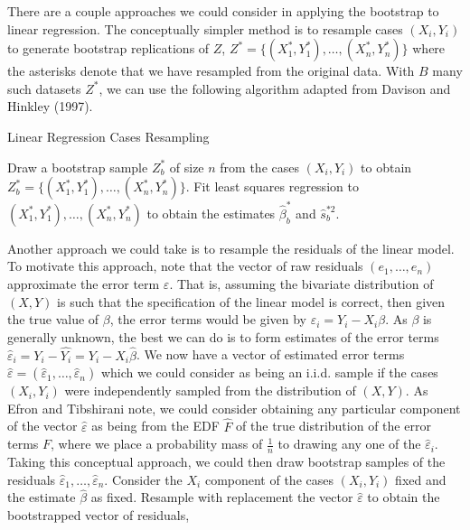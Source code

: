 \documentclass[12pt,twoside]{reedthesis}
\theoremstyle{definition}
\theoremstyle{definition}
\theoremstyle{definition}
\theoremstyle{remark}
\begin{document}
There are a couple approaches we could consider in applying the
bootstrap to linear regression. The conceptually simpler method is to
resample cases \((X_i,Y_i)\) to generate bootstrap replications of
\(Z\), \(Z^*=\{(X_1^*,Y_1^*),\ldots,(X_n^*,Y_n^*)\}\) where the
asterisks denote that we have resampled from the original data. With
\(B\) many such datasets \(Z^*\), we can use the following algorithm
adapted from Davison and Hinkley (1997).
\begin{algorithm}
        \caption{Linear Regression Cases Resampling}\label{cases resampling}
        \begin{algorithmic}[1]
            \State Draw a bootstrap sample $Z_b^*$ of size $n$ from the cases $(X_i,Y_i)$ to obtain $Z_b^*=\{(X_1^*,Y_1^*),\ldots,(X_n^*,Y_n^*)\}$.
            \State Fit least squares regression to $(X_1^*,Y_1^*),\ldots,(X_n^*,Y_n^*)$ to obtain the estimates $\hat{\beta}_b^*$ and $\hat{s}_b^{*2}$.
            \EndFor
        \end{algorithmic}
    \end{algorithm}
Another approach we could take is to resample the residuals of the
linear model. To motivate this approach, note that the vector of raw
residuals \((e_1,\ldots,e_n)\) approximate the error term
\(\varepsilon\). That is, assuming the bivariate distribution of
\((X,Y)\) is such that the specification of the linear model is correct,
then given the true value of \(\beta\), the error terms would be given
by \(\varepsilon_i=Y_i-X_i\beta\). As \(\beta\) is generally unknown,
the best we can do is to form estimates of the error terms
\(\hat{\varepsilon}_i=Y_i-\hat{Y_i}=Y_i-X_i\hat{\beta}\). We now have a
vector of estimated error terms
\(\hat{\varepsilon}=(\hat{\varepsilon}_1,\ldots,\hat{\varepsilon}_n)\)
which we could consider as being an i.i.d. sample if the cases
\((X_i,Y_i)\) were independently sampled from the distribution of
\((X,Y)\). As Efron and Tibshirani note, we could consider obtaining any
particular component of the vector \(\hat{\varepsilon}\) as being from
the EDF \(\hat{F}\) of the true distribution of the error terms \(F\),
where we place a probability mass of \(\frac{1}{n}\) to drawing any one
of the \(\hat{\varepsilon}_i\). Taking this conceptual approach, we
could then draw bootstrap samples of the residuals
\(\hat{\varepsilon}_1,\ldots,\hat{\varepsilon}_n\). Consider the \(X_i\)
component of the cases \((X_i,Y_i)\) fixed and the estimate
\(\hat{\beta}\) as fixed. Resample with replacement the vector
\(\hat{\varepsilon}\) to obtain the bootstrapped vector of residuals,
\end{document}

